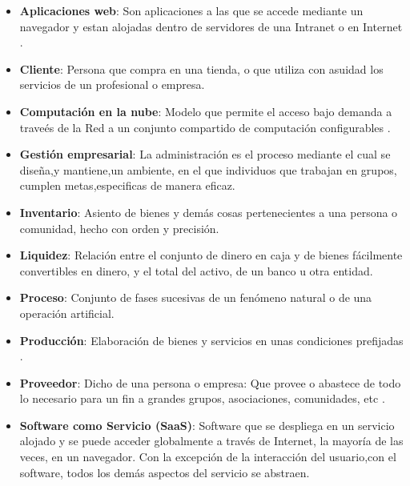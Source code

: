 \begin{itemize}
  \item \textbf{Aplicaciones web}: Son aplicaciones a las que se accede mediante un navegador y estan
        alojadas dentro de servidores de una Intranet o en Internet \citep{nino}.
  \item \textbf{Cliente}: Persona que compra en una tienda, o que utiliza con asuidad los servicios
        de un profesional o empresa\citep{rae}.
  \item \textbf{Computaci\'on en la nube}: Modelo que permite el acceso bajo demanda a trave\'es
        de la Red a un conjunto compartido de computaci\'on configurables \citep{nist}.
  \item \textbf{Gesti\'on empresarial}: La administraci\'on es el proceso mediante el cual
        se dise\~na,y mantiene,un ambiente, en el que individuos que trabajan en grupos,
        cumplen metas,especificas de manera eficaz\citep{koontz}.
  \item \textbf{Inventario}: Asiento de bienes y dem\'as cosas pertenecientes a una persona o
        comunidad, hecho con orden y precisi\'on\citep{rae}.
  \item \textbf{Liquidez}: Relaci\'on entre el conjunto de dinero en caja y de bienes f\'acilmente
        convertibles en dinero, y el total del activo, de un banco u otra
        entidad\citep{rae}.
  \item \textbf{Proceso}: Conjunto de fases sucesivas de un fen\'omeno natural o de una
        operaci\'on artificial\citep{rae}.
  \item \textbf{Producci\'on}: Elaboraci\'on de bienes y servicios en unas condiciones prefijadas \citep{carro}.
  \item \textbf{Proveedor}: Dicho de una persona o empresa: Que provee o abastece de todo lo necesario
        para un fin a grandes grupos, asociaciones, comunidades, etc \citep{rae}.
  \item \textbf{Software como Servicio (SaaS)}: Software que se despliega en un servicio alojado y se
        puede acceder globalmente a trav\'es de Internet, la mayor\'ia de las veces,
        en un navegador. Con la excepci\'on de la interacci\'on del usuario,con el
        software, todos los dem\'as aspectos del servicio se abstraen\citep{sosinsky}.
\end{itemize}
